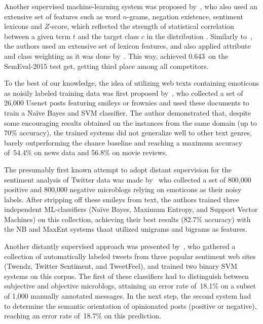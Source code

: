 
Another supervised machine-learning system was proposed
by~\citet{Hamdan:15}, who also used an extensive set of features such
as word $n$-grams, negation existence, sentiment lexicons and
$Z$-score, which reflected the strength of statistical correlation
between a given term $t$ and the target class $c$ in the distribution
\cite[cf.][]{Hamdan:14}.  Similarly to~\citet{Mohammad:13}, the
authors used an extensive set of lexicon features, and also applied
attribute and class weighting as it was done by~\citet{Guenther:14}.
This way, \citeauthor{Hamdan:15} achieved 0.643~\F on the SemEval-2015
test get, getting third place among all competitors.

\todo[inline]{}

To the best of our knowledge, the idea of utilizing web texts
containing emoticons as noisily labeled training data was first
proposed by~\citet{Read:05}, who collected a set of 26,000 Usenet
posts featuring smileys or frownies and used these documents to train
a Na{\"i}ve Bayes and SVM classifier.  The author demonstrated that,
despite some encouraging results obtained on the instances from the
same domain (up to 70\% accuracy), the trained systems did not
generalize well to other text genres, barely outperforming the chance
baseline and reaching a maximum accuracy of~54.4\% on news data and
56.8\% on movie reviews.

The presumably first known attempt to adopt distant supervision for
the sentiment analysis of Twitter data was made by~\citet{Go:09} who
collected a set of 800,000 positive and 800,000 negative microblogs
relying on emoticons as their noisy labels.  After stripping off these
smileys from text, the authors trained three independent
ML-classifiers (Na{\"i}ve Bayes, Maximum Entropy, and Support Vector
Machines) on this collection, achieving their best results (82.7\%
accuracy) with the NB and MaxEnt systems thaat utilized unigrams and
bigrams as features.

Another distantly supervised approach was presented
by~\citet{Barbosa:10}, who gathered a collection of automatically
labeled tweets from three popular sentiment web sites (Twendz, Twitter
Sentiment, and TweetFeel), and trained two binary SVM systems on this
corpus.  The first of these classifiers had to distinguish between
subjective and objective microblogs, attaining an error rate of~18.1\%
on a subset of 1,000 manually annotated messages.  In the next step,
the second system had to determine the semantic orientation of
opinionated posts (positive or negative), reaching an error rate
of~18.7\% on this prediction.

